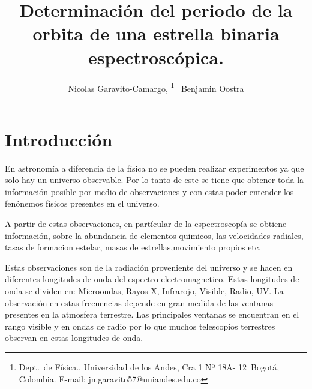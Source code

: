 \documentclass[Proceedings]{ascelike}
\begin{document}
%
\title{Determinaci\'on del periodo de la orbita de una estrella binaria espectrosc\'opica.}
%
\author{
Nicolas Garavito-Camargo,%
%
\thanks{
Dept.\ de F\'isica.,
Universidad de los Andes, 
Cra 1 Nº 18A- 12\ Bogot\'a, Colombia. E-mail: jn.garavito57@uniandes.edu.co}
\ Benjamin Oostra\footnotemark[1]
%
%
%
%
%
%
}
%
\maketitle
%

\section*{Introducci\'on}

En astronom\'ia a diferencia de la f\'isica no se pueden realizar experimentos ya
que solo hay un universo observable. Por lo tanto de este se tiene que obtener 
toda la informaci\'on posible por medio de observaciones y con estas poder entender 
los fen\'onemos f\'isicos presentes en el universo.

A partir de estas observaciones, en part\'icular de la espectroscop\'ia se obtiene informaci\'on,
sobre la abundancia de elementos quimicos, las velocidades radiales, tasas de formacion estelar, 
masas de estrellas,movimiento propios etc.

Estas observaciones son de la radiaci\'on proveniente del universo y se hacen
 en diferentes longitudes de onda del espectro electromagnetico. Estas longitudes 
 de onda se dividen en: Microondas, Rayos X, Infrarojo, Visible, Radio, UV. La observaci\'on 
 en estas frecuencias depende en gran medida de las ventanas presentes en la atmosfera terrestre.
Las principales ventanas se encuentran en el rango visible y en ondas de radio por lo que muchos telescopios terrestres observan en estas longitudes de onda. 
\end{document}
